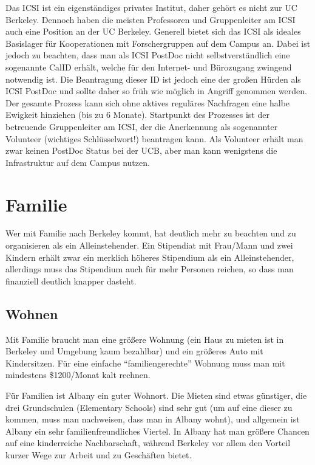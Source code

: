 \documentclass[a4paper]{scrreprt}
\begin{document}
Das ICSI ist ein eigenständiges privates Institut, daher gehört es nicht zur UC Berkeley. 
Dennoch haben die meisten Professoren und Gruppenleiter am ICSI auch eine Position an der UC Berkeley. 
Generell bietet sich das ICSI als ideales Basislager für Kooperationen mit Forschergruppen auf dem Campus an. 
Dabei ist jedoch zu beachten, dass man als ICSI PostDoc nicht selbstverständlich eine sogenannte CalID erhält, 
welche für den Internet- und Bürozugang zwingend notwendig ist. Die Beantragung dieser ID ist jedoch eine der großen Hürden als ICSI PostDoc und sollte daher so früh wie möglich in Angriff genommen werden. Der gesamte Prozess kann sich ohne aktives reguläres Nachfragen eine halbe Ewigkeit hinziehen (bis zu 6 Monate). Startpunkt des Prozesses ist der betreuende Gruppenleiter am ICSI, der die Anerkennung als sogenannter Volunteer (wichtiges Schlüsselwort!) beantragen kann. Als Volunteer erhält man zwar keinen PostDoc Status bei der UCB, aber man kann wenigstens die Infrastruktur auf dem Campus nutzen. 


\chapter{Familie}

Wer mit Familie nach Berkeley kommt, hat deutlich mehr zu beachten und zu organisieren als ein Alleinstehender. Ein Stipendiat mit Frau/Mann und zwei Kindern erhält zwar ein merklich höheres Stipendium als ein Alleinstehender, allerdings muss das Stipendium auch für mehr Personen reichen, so dass man finanziell deutlich knapper dasteht.


\section{Wohnen}

Mit Familie braucht man eine größere Wohnung (ein Haus zu mieten ist in Berkeley und Umgebung kaum bezahlbar) 
und ein größeres Auto mit Kindersitzen. 
Für eine einfache "`familiengerechte"' Wohnung muss man mit  mindestens \$1200/Monat kalt rechnen.

Für Familien ist Albany ein guter Wohnort. Die Mieten sind etwas günstiger, die drei Grundschulen (Elementary Schools) sind sehr gut (um auf eine dieser zu kommen, muss man nachweisen, dass man in Albany wohnt), und allgemein ist Albany ein sehr familienfreundliches Viertel. In Albany hat man größere Chancen auf eine kinderreiche Nachbarschaft, während Berkeley vor allem den Vorteil kurzer Wege zur Arbeit und zu Geschäften bietet.
\end{document}
